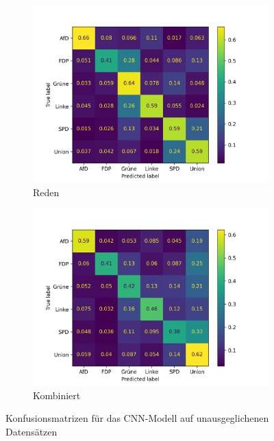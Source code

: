 \begin{figure}[H]
    \hfill
    \begin{subfigure}{0.49\textwidth}
        \includegraphics[width=\textwidth]{data/images/modeling/cnn/none/speeches_confusion_matrix.png}
        \caption{Reden}
        \label{sfig:confusionMatrixCnnSpeechesUnbalanced}
    \end{subfigure}
    \hfill
    \begin{subfigure}{0.49\textwidth}
        \includegraphics[width=\textwidth]{data/images/modeling/cnn/none/all_confusion_matrix.png}
        \caption{Kombiniert}
        \label{sfig:confusionMatrixCnnAllUnbalanced}
    \end{subfigure}
    \caption{Konfusionsmatrizen für das \acs{CNN}-Modell auf unausgeglichenen Datensätzen} \label{fig:confusionMatrixCnnUnbalanced}
\end{figure}

